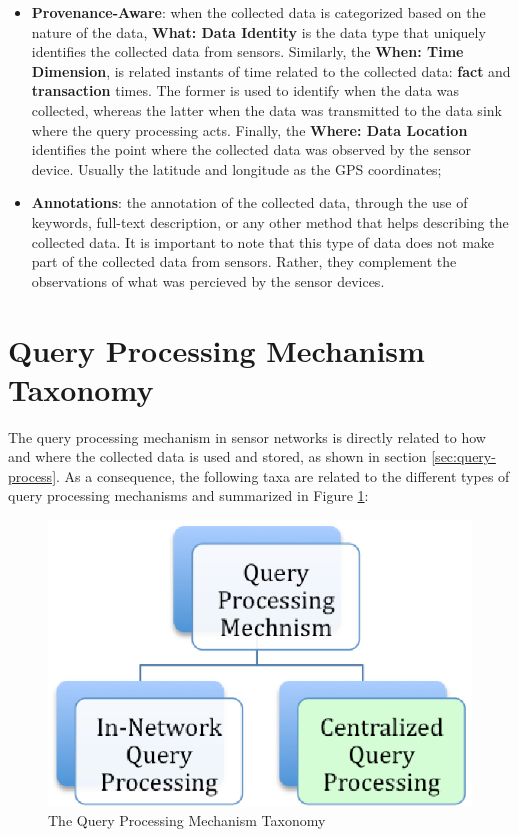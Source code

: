 \begin{itemize}
  \item \textbf{Provenance-Aware}: when the collected data is categorized based
  on the nature of the data, \textbf{What: Data Identity} is the data type
  that uniquely identifies the collected data from sensors. Similarly, the
  \textbf{When: Time Dimension}, is related instants of time related to the
  collected data: \textbf{fact} and \textbf{transaction} times. The former is
  used to identify when the data was collected, whereas the latter when the data was
  transmitted to the data sink where the query processing acts. Finally, the
  \textbf{Where: Data Location} identifies the point where the collected data
  was observed by the sensor device. Usually the latitude and longitude as the
  GPS coordinates;
  \item \textbf{Annotations}: the annotation of the collected data, through the
  use of keywords, full-text description, or any other method that helps
  describing the collected data. It is important to note that this type of data
  does not make part of the collected data from sensors. Rather, they
  complement the observations of what was percieved by the sensor devices.
\end{itemize}

\section{Query Processing Mechanism Taxonomy}

The query processing mechanism in sensor networks is directly related to how
and where the collected data is used and stored, as shown in section
\ref{sec:query-process}. As a consequence, the following taxa are related to the
different types of query processing mechanisms and summarized in Figure
\ref{fig:taxonomy-query-mechanism}:

\begin{figure}[h]
  \centering
  \includegraphics{../diagrams/taxonomy-query-mechanism}
  \caption{The Query Processing Mechanism Taxonomy}
  \label{fig:taxonomy-query-mechanism}
\end{figure}

